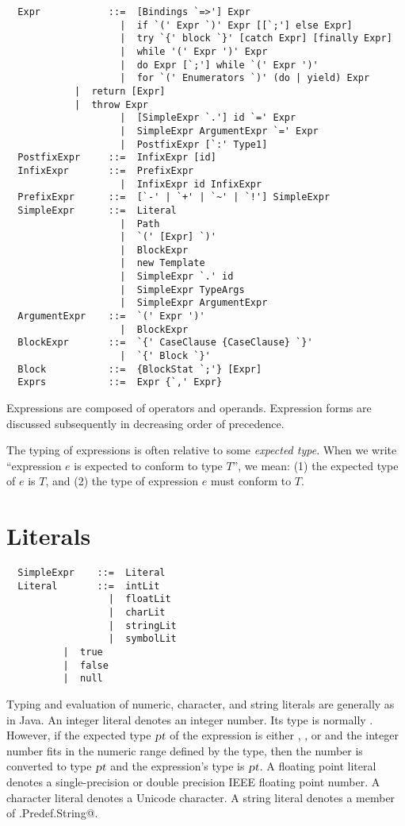 \documentclass[a4paper,12pt,twoside,titlepage]{book}
\newcommand{\proto}{\mbox{\sl pt}}
\begin{document}
\syntax\begin{lstlisting}
  Expr            ::=  [Bindings `=>'] Expr
                    |  if `(' Expr `)' Expr [[`;'] else Expr]
                    |  try `{' block `}' [catch Expr] [finally Expr]
                    |  while '(' Expr ')' Expr
                    |  do Expr [`;'] while `(' Expr ')'
                    |  for `(' Enumerators `)' (do | yield) Expr
		    |  return [Expr]
		    |  throw Expr
                    |  [SimpleExpr `.'] id `=' Expr
                    |  SimpleExpr ArgumentExpr `=' Expr
                    |  PostfixExpr [`:' Type1]
  PostfixExpr     ::=  InfixExpr [id]
  InfixExpr       ::=  PrefixExpr
                    |  InfixExpr id InfixExpr
  PrefixExpr      ::=  [`-' | `+' | `~' | `!'] SimpleExpr 
  SimpleExpr      ::=  Literal
                    |  Path
                    |  `(' [Expr] `)'
                    |  BlockExpr
                    |  new Template 
                    |  SimpleExpr `.' id 
                    |  SimpleExpr TypeArgs
                    |  SimpleExpr ArgumentExpr
  ArgumentExpr    ::=  `(' Expr ')'
                    |  BlockExpr
  BlockExpr       ::=  `{' CaseClause {CaseClause} `}'
                    |  `{' Block `}'
  Block           ::=  {BlockStat `;'} [Expr]
  Exprs           ::=  Expr {`,' Expr}
\end{lstlisting}

Expressions are composed of operators and operands. Expression forms are
discussed subsequently in decreasing order of precedence. 

The typing of expressions is often relative to some {\em expected
type}.  When we write ``expression $e$ is expected to conform to
type $T$'', we mean: (1) the expected type of $e$ is
$T$, and (2) the type of expression $e$ must conform to
$T$.

\section{Literals}

\syntax\begin{lstlisting}
  SimpleExpr    ::=  Literal
  Literal       ::=  intLit
                  |  floatLit
                  |  charLit
                  |  stringLit
                  |  symbolLit
		  |  true
		  |  false
		  |  null
\end{lstlisting}

Typing and evaluation of numeric, character, and string literals are
generally as in Java.  An integer literal denotes an integer
number. Its type is normally . However, if the expected type
$\proto$ of the expression is either , , or
 and the integer number fits in the numeric range defined
by the type, then the number is converted to type $\proto$ and the
expression's type is $\proto$.  A floating point literal denotes a
single-precision or double precision IEEE floating point number. A
character literal denotes a Unicode character. A string literal
denotes a member of \lstinline@scala.Predef.String@.
\end{document}

